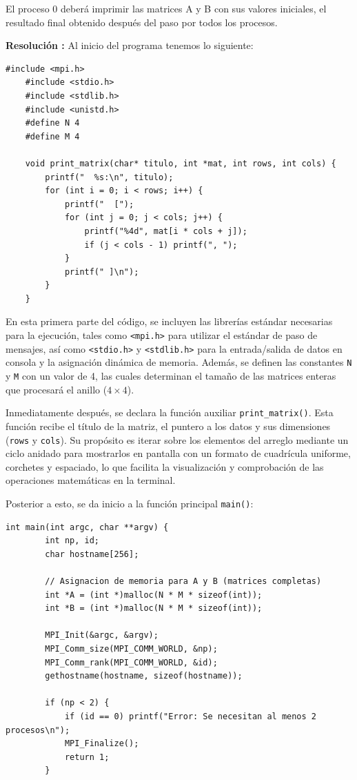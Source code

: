 \documentclass[letterpaper,11pt]{article}
\begin{document}
    El proceso 0 deberá imprimir las matrices A y B con sus valores iniciales, el resultado final obtenido después del paso por todos los procesos. 

    \textbf{Resolución :}
    Al inicio del programa tenemos lo siguiente:

    \begin{lstlisting}[style=cstyle,caption={Inclusiones, definiciones y funcion de impresion},label={lst:programa-a-init}]
    #include <mpi.h>
    #include <stdio.h>
    #include <stdlib.h>
    #include <unistd.h>
    #define N 4
    #define M 4

    void print_matrix(char* titulo, int *mat, int rows, int cols) {
        printf("  %s:\n", titulo);
        for (int i = 0; i < rows; i++) {
            printf("  [");
            for (int j = 0; j < cols; j++) {
                printf("%4d", mat[i * cols + j]);
                if (j < cols - 1) printf(", ");
            }
            printf(" ]\n");
        }
    }
    \end{lstlisting}

    En esta primera parte del código, se incluyen las librerías estándar necesarias para la ejecución, tales como \texttt{<mpi.h>} para utilizar el estándar de paso de mensajes, así como \texttt{<stdio.h>} y \texttt{<stdlib.h>} para la entrada/salida de datos en consola y la asignación dinámica de memoria. Además, se definen las constantes \texttt{N} y \texttt{M} con un valor de 4, las cuales determinan el tamaño de las matrices enteras que procesará el anillo ($4 \times 4$).

    Inmediatamente después, se declara la función auxiliar \texttt{print\_matrix()}. Esta función recibe el título de la matriz, el puntero a los datos y sus dimensiones (\texttt{rows} y \texttt{cols}). Su propósito es iterar sobre los elementos del arreglo mediante un ciclo anidado para mostrarlos en pantalla con un formato de cuadrícula uniforme, corchetes y espaciado, lo que facilita la visualización y comprobación de las operaciones matemáticas en la terminal.

    Posterior a esto, se da inicio a la función principal \texttt{main()}:

    \begin{lstlisting}[style=cstyle,caption={Inicializacion del entorno y asignacion de memoria},label={lst:programa-a}]
    int main(int argc, char **argv) {
        int np, id;
        char hostname[256];
        
        // Asignacion de memoria para A y B (matrices completas)
        int *A = (int *)malloc(N * M * sizeof(int));
        int *B = (int *)malloc(N * M * sizeof(int));

        MPI_Init(&argc, &argv);
        MPI_Comm_size(MPI_COMM_WORLD, &np);
        MPI_Comm_rank(MPI_COMM_WORLD, &id);
        gethostname(hostname, sizeof(hostname));

        if (np < 2) {
            if (id == 0) printf("Error: Se necesitan al menos 2 procesos\n");
            MPI_Finalize();
            return 1;
        }
    \end{lstlisting}
    
\end{document}
